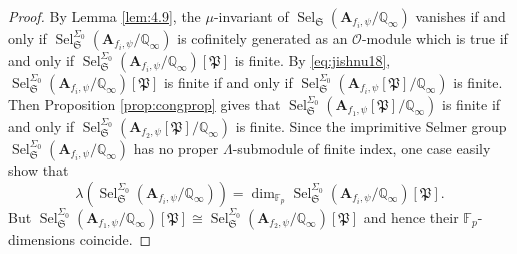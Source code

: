 \documentclass[10pt,a4paper]{amsart}
\newcommand{\Q}{\mathbb{Q}}
\newcommand{\fS}{\mathfrak{S}}
\newcommand{\bA}{\mathbf{A}}
\newcommand{\Sel}{\operatorname{Sel}}
\renewcommand{\O}{\mathcal{O}}
\begin{document}
\begin{proof}
    By Lemma \ref{lem:4.9}, the $\mu$-invariant of $\Sel_{\fS}(\bA_{f_i, \psi}/\Q_\infty)$ vanishes if and only if $\Sel_{\fS}^{\Sigma_0}(\bA_{f_i, \psi}/\Q_\infty)$ is cofinitely generated as an $\O$-module which is true if and only if $\Sel_{\fS}^{\Sigma_0}(\bA_{f_i, \psi}/\Q_\infty)[\mathfrak{P}]$ is finite. By \eqref{eq:jishnu18}, $\Sel_{\fS}^{\Sigma_0}(\bA_{f_i, \psi}/\Q_\infty)[\mathfrak{P}]$ is finite if and only if  $\Sel_{\fS}^{\Sigma_0}(\bA_{f_i, \psi}[\mathfrak{P}]/\Q_\infty)$ is finite.  Then Proposition \ref{prop:congprop} gives that $\Sel_{\fS}^{\Sigma_0}(\bA_{f_1, \psi}[\mathfrak{P}]/\Q_\infty)$ is finite if and only if $\Sel_{\fS}^{\Sigma_0}(\bA_{f_2, \psi}[\mathfrak{P}]/\Q_\infty)$ is finite. 
\vspace{.2cm}
Since the imprimitive Selmer group $\Sel^{\Sigma_0}_{\fS}(\bA_{f_i, \psi}/\Q_\infty)$ has no proper $\Lambda$-submodule of finite index, one case easily show that $$\lambda(\Sel^{\Sigma_0}_{\fS}(\bA_{f_i, \psi}/\Q_\infty))=\dim_{\mathbb{F}_p}\Sel_{\fS}^{\Sigma_0}(\bA_{f_i, \psi}/\Q_\infty)[\mathfrak{P}].$$ But $\Sel_{\fS}^{\Sigma_0}(\bA_{f_1, \psi}/\Q_\infty)[\mathfrak{P}]\cong \Sel_{\fS}^{\Sigma_0}(\bA_{f_2, \psi}/\Q_\infty)[\mathfrak{P}]$ and hence their $\mathbb{F}_p$-dimensions coincide. 
\end{proof}
\end{document}
